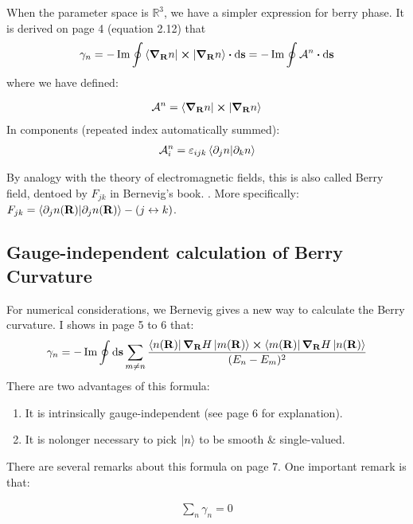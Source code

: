 When the parameter space is $\mathbb{R}^3$, we have a simpler
expression for berry phase. It is derived on page 4 (equation 2.12)
that
\begin{align}
    \gamma_n = -\Im \oint \braket{\grad_{\vb{R}}
    n|\cross|\grad_{\vb{R}} n} \vdot \dd \vb{s}
    = -\Im \oint \mathcal{A}^n \vdot \dd\vb{s}
\end{align}
where we have defined:
\begin{defi}
    \begin{align}
        \mathcal{A}^n = \braket{\grad_{\vb{R}} n|\cross|\grad_{\vb{R}} n}
    \end{align}
    In components (repeated index automatically summed):
    \begin{align}
        \mathcal{A}_i^n = \varepsilon_{ijk} \braket{\partial_j n |
        \partial_k n}
    \end{align}
\end{defi}
By analogy with the theory of electromagnetic fields, this is also
called Berry field, dentoed by $F_{jk}$ in Bernevig's book.
. More specifically:
$F_{jk} = \braket{\partial_j n(\vb{R})|\partial_j n(\vb{R})} - (j
    \leftrightarrow k) $.

\subsection{Gauge-independent calculation of Berry Curvature}
\label{sec:Gauge-independent-calculation-of-Berry-Curvature}
For numerical considerations, we Bernevig gives a new way to calculate
the Berry curvature. I shows in page 5 to 6 that:
\begin{align}
    \gamma_n = -\Im \oint \dd\vb{s} \sum_{m\neq n}
    \frac{\bra{n(\vb{R})}\grad_{\vb{R}} H \ket{m(\vb{R})}
        \cross \bra{m(\vb{R})}\grad_{\vb{R}} H \ket{n(\vb{R})} }
        {(E_n-E_m)^2}
\end{align}
There are two advantages of this formula:
\begin{enumerate}
    \item It is intrinsically gauge-independent (see page 6 for
        explanation).
    \item It is nolonger necessary to pick $\ket{n}$ to be smooth \&
        single-valued. 
\end{enumerate}
There are several remarks about this formula on page 7. One important
remark is that:
\begin{fact}
    \begin{align}
        \sum_n \gamma_n = 0
    \end{align}
\end{fact}

